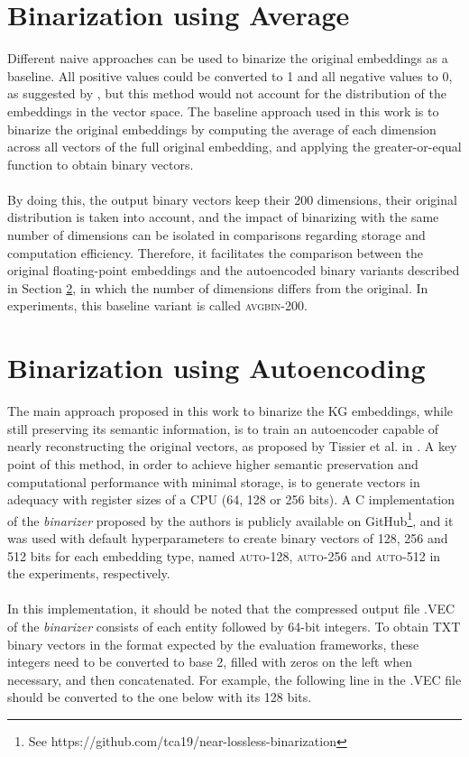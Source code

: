\documentclass[11pt,titlepage,oneside,openany]{book}
\begin{document}
\section{Binarization using Average}
\label{sec:emb-avgbin}

Different naive approaches can be used to binarize the original embeddings as a baseline. All positive values could be converted to 1 and all negative values to 0, as suggested by \cite{tissier_near-lossless_2019}, but this method would not account for the distribution of the embeddings in the vector space. The baseline approach used in this work is to binarize the original embeddings by computing the average of each dimension across all vectors of the full original embedding, and applying the greater-or-equal function to obtain binary vectors. \\
\\
By doing this, the output binary vectors keep their 200 dimensions, their original distribution is taken into account, and the impact of binarizing with the same number of dimensions can be isolated in comparisons regarding storage and computation efficiency. Therefore, it facilitates the comparison between the original floating-point embeddings and the autoencoded binary variants described in Section \ref{sec:emb-autoencoding}, in which the number of dimensions differs from the original. In experiments, this baseline variant is called \textsc{avgbin-200}.


\section{Binarization using Autoencoding}
\label{sec:emb-autoencoding}

The main approach proposed in this work to binarize the KG embeddings, while still preserving its semantic information, is to train an autoencoder capable of nearly reconstructing the original vectors, as proposed by Tissier et al. in \cite{tissier_near-lossless_2019}. A key point of this method, in order to achieve higher semantic preservation and computational performance with minimal storage, is to generate vectors in adequacy with register sizes of a CPU (64, 128 or 256 bits). A C implementation of the \textit{binarizer} proposed by the authors is publicly available on GitHub\footnote{See https://github.com/tca19/near-lossless-binarization}, and it was used with default hyperparameters to create binary vectors of 128, 256 and 512 bits for each embedding type, named \textsc{auto-128}, \textsc{auto-256} and \textsc{auto-512} in the experiments, respectively.\\
\\
In this implementation, it should be noted that the compressed output file \textsc{.VEC} of the \textit{binarizer} consists of each entity followed by 64-bit integers. To obtain TXT binary vectors in the format expected by the evaluation frameworks, these integers need to be converted to base 2, filled with zeros on the left when necessary, and then concatenated. For example, the following line in the \textsc{.VEC} file should be converted to the one below with its 128 bits.
\end{document}
